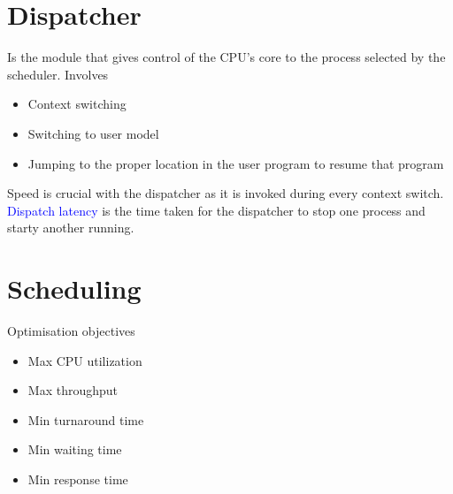 \documentclass{book/custombook}
\begin{document}
        \section{Dispatcher}
            Is the module that gives control of the CPU's core to the process selected by the scheduler.
            Involves
            \begin{itemize}
                \item Context switching
                \item Switching to user model
                \item Jumping to the proper location in the user program to resume that program
            \end{itemize}
            Speed is crucial with the dispatcher as it is invoked during every context switch.\\
            \textcolor{blue}{Dispatch latency} is the time taken for the dispatcher to stop one process and
            starty another running.\\
        \section{Scheduling}
            Optimisation objectives
            \begin{itemize}
                \item Max CPU utilization
                \item Max throughput
                \item Min turnaround time
                \item Min waiting time
                \item Min response time
            \end{itemize}
\end{document}

